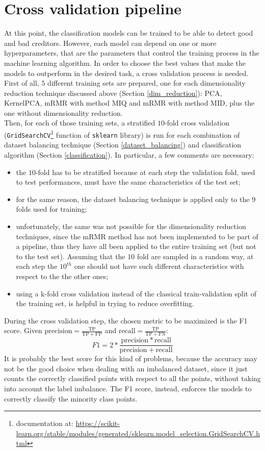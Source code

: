 \documentclass[letterpaper]{article}
\begin{document}
	\section{Cross validation pipeline}
	At this point, the classification models can be trained to be able to detect good and bad creditors. However, each model can depend on one or more hyperparameters, that are the parameters that control the training process in the machine learning algorithm. In order to choose the best values that make the models to outperform in the desired task, a cross validation process is needed. \\
	First of all, $5$ different training sets are prepared, one for each dimensionality reduction technique discussed above (Section \ref{dim_reduction}): PCA, KernelPCA, mRMR with method MIQ and mRMR with method MID, plus the one without dimensionality reduction.\\
	Then, for each of those training sets, a stratified $10$-fold cross validation (\texttt{GridSearchCV}\footnote{documentation at: \url{https://scikit-learn.org/stable/modules/generated/sklearn.model_selection.GridSearchCV.html}} function of \texttt{sklearn} library) is run for each combination of dataset balancing technique (Section \ref{dataset_balancing}) and classification algorithm (Section \ref{classification}). 
	In particular, a few comments are necessary:
	\begin{itemize}
		\item the $10$-fold has to be stratified because at each step the validation fold, used to test performances, must have the same characteristics of the test set;
		\item for the same reason, the dataset balancing technique is applied only to the $9$ folds used for training;
		\item unfortunately, the same was not possible for the dimensionality reduction techniques, since the mRMR method has not been implemented to be part of a pipeline, thus they have all been applied to the entire training set (but not to the test set). Assuming that the $10$ fold are sampled in a random way, at each step the $10^{th}$ one should not have such different characteristics with respect to the the other ones;
		\item using a k-fold cross validation instead of the classical train-validation split of the training set, is helpful in trying to reduce overfitting.
	\end{itemize}
	During the cross validation step, the chosen metric to be maximized is the F1 score. Given $\mathrm{precision} = \frac{\mathrm{TP}}{\mathrm{TP}+\mathrm{FP}}$ and $\mathrm{recall} =  \frac{\mathrm{TP}}{\mathrm{TP}+\mathrm{FN}}$:
	\begin{equation}\label{f1}	
		F1 = 2 * \frac{\mathrm{precision}*\mathrm{recall}}{\mathrm{precis	ion}+\mathrm{recall}}
	\end{equation}
	It is probably the best score for this kind of problems, because the accuracy may not be the good choice when dealing with an imbalanced dataset, since it just counts the correctly classified points with respect to all the points, without taking into account the label imbalance. The F1 score, instead, enforces the models to correctly classify the minority class points.
\end{document}

